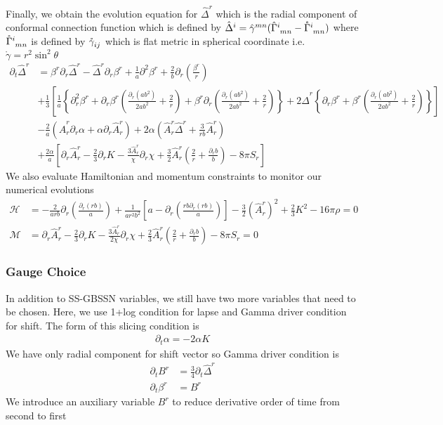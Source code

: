 \documentclass[prd]{revtex4}
\begin{document}
Finally, we obtain the evolution equation for $\hat{\Delta}^r$ which is the radial component of conformal connection function which is defined by $\hat{\Delta}^i = \hat{\gamma}^{mn}( \hat{\Gamma}\indices{^i_{mn}} - \mathring{\Gamma}\indices{^i_{mn}})$ where $\mathring{\Gamma}\indices{^i_{mn}}$ is defined by $\mathring{\gamma}\indices{_{ij}}$ which is flat metric in spherical coordinate i.e. $\mathring{\gamma}=r^2 \sin^2 \theta$
\begin{align}
\partial_t \hat{\Delta}^r &= \beta^r \partial_r \hat{\Delta}^r - \hat{\Delta}^r \partial_r \beta^r + \frac{1}{a} \partial^2 \beta^r + \frac{2}{b} \partial_r \left(\frac{\beta^r}{r} \right) \nonumber \\
&+\frac{1}{3}\left[\frac{1}{a} \left\{\partial_r^2 \beta^r + \partial_r \beta^r  \left(\frac{\partial_r (a b^2)}{2 a b^2} + \frac{2}{r}\right) + \beta^r \partial_r \left(\frac{\partial_r (a b^2)}{2 a b^2} + \frac{2}{r}\right)\right\} + 2 \hat{\Delta}^r \left\{\partial_r \beta^r +\beta^r \left(\frac{\partial_r (a b^2)}{2 a b^2} + \frac{2}{r}\right)\right\}\right]  \nonumber \\
&-\frac{2}{a} (\hat{A}^r_r \partial_r \alpha + \alpha \partial_r \hat{A}^r_r) + 2 \alpha \left(\hat{A}^r_r \hat{\Delta}^r + \frac{3}{rb} \hat{A}^r_r \right) \nonumber \\
&+ \frac{2\alpha}{a} \left[ \partial_r \hat{A}^r_r - \frac{2}{3} \partial_r K - \frac{3\hat{A}^r_r}{\chi} \partial_r \chi + \frac{3}{2} \hat{A}^r_r \left(\frac{2}{r} + \frac{\partial_r b}{b} \right) - 8 \pi S_r \right]
\end{align}
We also evaluate Hamiltonian and momentum constraints to monitor our numerical evolutions
\begin{align}
\mathcal{H} &= -\frac{2}{arb} \partial_r \left(\frac{\partial_r (rb)}{a} \right) + \frac{1}{ar^2b^2} \left[a-\partial_r \left(\frac{rb \partial_r (rb)}{a} \right) \right] - \frac{3}{2} (\hat{A}^r_r)^2 + \frac{2}{3} K^2 - 16 \pi \rho = 0 \\
\mathcal{M} &= \partial_r \hat{A}^r_r - \frac{2}{3} \partial_r K - \frac{3 \hat{A}^r_r}{2\chi}\partial_r \chi + \frac{2}{3} \hat{A}^r_r \left(\frac{2}{r} + \frac{\partial_r b}{b} \right) - 8 \pi S_r = 0
\end{align}
\subsubsection{Gauge Choice}
In addition to SS-GBSSN variables, we still have two more variables that need to be chosen. Here, we use 1+log condition for lapse and Gamma driver condition for shift.
The form of this slicing condition is
\begin{align}
\partial_t \alpha = -2\alpha K
\end{align}
We have only radial component for shift vector so Gamma driver condition is
\begin{align}
\partial_t B^r &= \frac{3}{4} \partial_t \hat{\Delta}^r \\
\partial_t \beta^r &= B^r
\end{align}
We introduce an auxiliary variable $B^r$ to reduce derivative order of time from second to first
\end{document}
